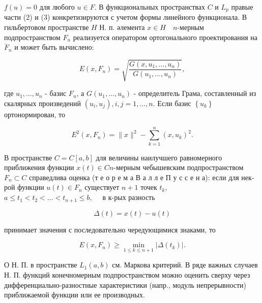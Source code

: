 \documentclass[10pt]{article}
\begin{document}
$f(u)=0$ для любого $u \in F$. В функциональных пространствах $C$ и $L_{p}$ правые части (2) и (3) конкретизируются с учетом формы линейного функционала. В гильбертовом пространстве $H$ Н. п. әлемента $x \in H \quad n$-мерным подпространством $F_{n}$ реализуется оператором ортогонального проектирования на $\dot{F}_{n}$ и может быть вычислено:



\[

E\left(x, F_{n}\right)=\sqrt{\frac{G\left(x, u_{1}, \ldots, u_{n}\right)}{G\left(u_{1}, \ldots, u_{n}\right)}},

\]



где $u_{1}, \ldots, u_{n}$ - базис $F_{n}$, а $G\left(u_{1}, \ldots, u_{n}\right)$ - определитель Грама, составленный из скалярных произведений $\left(u_{i}, u_{j}\right), i, j=1, \ldots, n$. Если базис $\left\{u_{k}\right\}$ ортонормирован, то



\[

E^{2}\left(x, F_{n}\right)=\|x\|^{2}-\sum_{k=1}^{n}\left(x, u_{k}\right)^{2} .

\]



В пространстве $C=C[a, b]$ для величины наилучшего равномерного приближения функции $x(t) \in C n$-мерным чебышевским подпространством $F_{n} \subset C$ справедлива оценка (т е о р е м а В а л л е П у с с е н а): если для нек-рой функции $u(t) \in F_{n}$ существует $n+1$ точек $t_{k}$, $a \leqslant t_{1}<t_{2}<\ldots<t_{n+1} \leqslant b, \quad$ в к-рых разность



\[

\Delta(t)=x(t)-u(t)

\]



принимает значения с последовательно чередующимися знаками, то



\[

E\left(x, F_{n}\right) \geqslant \min _{1 \leqslant k \leqslant n+1}\left|\Delta\left(t_{k}\right)\right| .

\]



О Н. П. в пространстве $L_{1}(a, b)$ см. Маркова критерий. В ряде важных случаев Н. П. функций конечномерным подпространством можно оценить сверху через дифференциально-разностные характеристики (напр., модуль непрерывности) приближаемой функции или ее производных.
\end{document}

